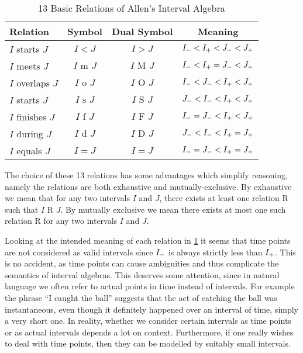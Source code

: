 \begin{table}[htpb]
  \centering
  \begin{tabular}{|l|c|c|c|}
    \hline
    Relation & Symbol & Dual Symbol & Meaning \\
    \hline
    \(I\) starts \(J\)
             & \(I < J\)
             & \(I > J\)
             & \(I_{-} < I_{+} < J_{-} < J_{+}\)\\
    \(I\) meets \(J\)
             & \(I\text{ m } J\)
             & \(I\text{ M } J\)
             & \(I_{-} < I_{+} = J_{-} < J_{+}\)\\
    \(I\) overlaps \(J\)
             & \(I\text{ o } J\)
             & \(I\text{ O } J\)
             & \(I_{-} < J_{-} < I_{+} < J_{+}\)\\
    \(I\) starts \(J\)
             & \(I\text{ s } J\)
             & \(I\text{ S } J\)
             & \(J_{-} < I_{-} < I_{+} < J_{+}\)\\
    \(I\) finishes \(J\)
             & \(I\text{ f } J\)
             & \(I\text{ F } J\)
             & \(I_{-} = J_{-} < I_{+} < J_{+}\)\\
    \(I\) during \(J\)
             & \(I\text{ d } J\)
             & \(I\text{ D } J\)
             & \(J_{-} < I_{-} < I_{+} = J_{+}\)\\
    \(I\) equals \(J\)
             & \(I = J\)
             & \(I = J\)
             & \(I_{-} = J_{-} < I_{+} = J_{+}\)\\
    \hline
  \end{tabular}
  \caption{13 Basic Relations of Allen's Interval Algebra}
  \label{tab:basic_relations}
\end{table}

The choice of these 13 relations has some advantages which simplify reasoning, namely the
relations are both exhaustive and mutually-exclusive.  By exhaustive we mean that for any two
intervals $I$ and $J$, there exists at least one relation R  such that $I\text{ R }J$. By
mutually exclusive we mean there exists at most one such relation R for any two intervals $I$ and 
$J$. 

Looking at the intended meaning of each relation in \cref{tab:basic_relations} it seems that time
points are not considered as valid intervals since $I_{-}$ is always strictly less than
$I_{+}$. This is no accident, as time points can cause ambiguities and thus complicate the
semantics of interval algebras. This deserves some attention, since in natural language we often
refer to actual points in time instead of intervals.  For example the phrase ``I caught the ball''
suggests that the act of catching the ball was instantaneous, even though it definitely
happened over an interval of time, simply a very short one. In reality, whether we consider
certain intervals as time points or as actual intervals depends a lot on context. Furthermore,
if one really wishes to deal with time points, then they can be modelled by suitably small
intervals.

